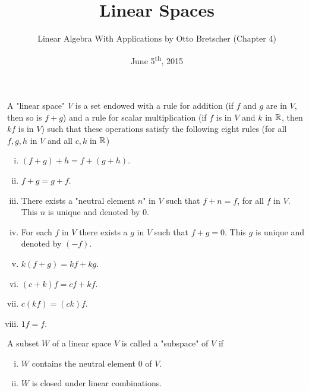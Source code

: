 \documentclass[a4paper,11pt]{article}
\title{Linear Spaces}
\author{Linear Algebra With Applications by Otto Bretscher (Chapter 4)}
\date{June 5\textsuperscript{th}, 2015}
\begin{document}
\maketitle
{}

\begin{outline}

    A "linear space" \(V\) is a set endowed with a rule for addition (if \(f\) and \(g\) are in \(V\), then so is 
    \(f + g\)) and a rule for scalar multiplication (if \(f\) is in \(V\) and \(k\) in \(\mathbb{R}\), then \(kf\) is in 
    \(V\)) such that these operations satisfy the following eight rules (for all \(f, g, h\) in \(V\) and all 
    \(c, k\) in \(\mathbb{R}\))
    \begin{enumerate}[i.]
      \item \((f + g) + h = f+ (g + h)\).
      \item \(f + g = g + f\).
      \item There exists a "neutral element \(n\)" in \(V\) such that \(f + n = f\), for all 
            \(f\) in \(V\). This \(n\) is unique and denoted by \(0\).
      \item For each \(f\) in \(V\) there exists a \(g\) in \(V\) such that \(f + g = 0\). This 
            \(g\) is unique and denoted by \((-f)\).
      \item \(k(f + g) = kf + kg\).
      \item \((c + k)f = cf + kf\).
      \item \(c(kf) = (ck)f\).
      \item \(1f = f\).
    \end{enumerate}
    
    A subset \(W\) of a linear space \(V\) is called a "subspace" of \(V\) if
    \begin{enumerate}[i.]
      \item \(W\) contains the neutral element \(0\) of \(V\).
      \item \(W\) is closed under linear combinations.
    \end{enumerate}
    

\end{outline}
\end{document}
